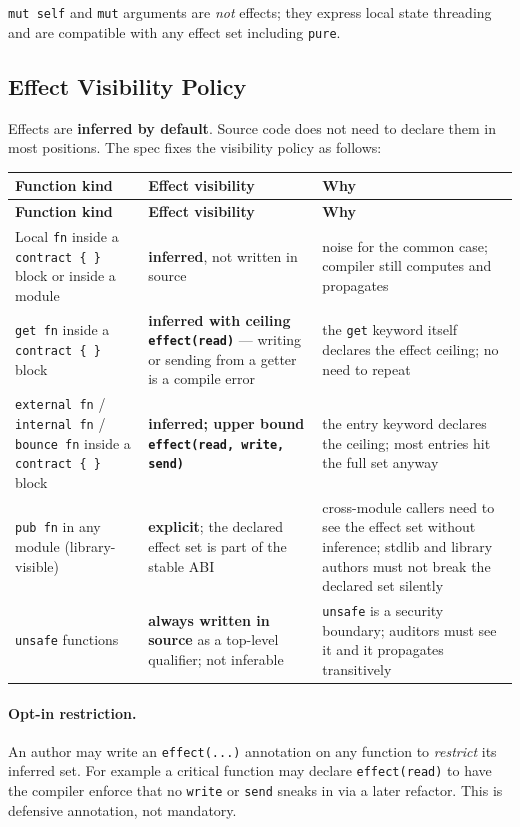 \documentclass[12pt,oneside]{article}
\begin{document}
\verb|mut self| and \verb|mut| arguments are \emph{not} effects; they
express local state threading and are compatible with any effect set
including \verb|pure|.

\subsection{Effect Visibility Policy}
\label{sec:effect-visibility}
Effects are \textbf{inferred by default}. Source code does not need to
declare them in most positions. The spec fixes the visibility policy
as follows:

\begin{longtable}{|p{}|p{}|p{}|}
\hline
\textbf{Function kind} & \textbf{Effect visibility} & \textbf{Why} \\ \hline
\endfirsthead
\hline
\textbf{Function kind} & \textbf{Effect visibility} & \textbf{Why} \\ \hline
\endhead
Local \verb|fn| inside a \verb|contract { }| block or inside a module &
\textbf{inferred}, not written in source &
noise for the common case; compiler still computes and propagates \\ \hline
\verb|get fn| inside a \verb|contract { }| block &
\textbf{inferred with ceiling \texttt{effect(read)}} --- writing or
sending from a getter is a compile error &
the \verb|get| keyword itself declares the effect ceiling; no need to
repeat \\ \hline
\verb|external fn| / \verb|internal fn| / \verb|bounce fn| inside a
\verb|contract { }| block &
\textbf{inferred; upper bound \texttt{effect(read, write, send)}} &
the entry keyword declares the ceiling; most entries hit the full set
anyway \\ \hline
\verb|pub fn| in any module (library-visible) &
\textbf{explicit}; the declared effect set is part of the stable ABI &
cross-module callers need to see the effect set without inference;
stdlib and library authors must not break the declared set
silently \\ \hline
\verb|unsafe| functions &
\textbf{always written in source} as a top-level qualifier; not inferable &
\verb|unsafe| is a security boundary; auditors must see it and it
propagates transitively \\ \hline
\end{longtable}

\paragraph{Opt-in restriction.}
An author may write an \verb|effect(...)| annotation on any function
to \emph{restrict} its inferred set. For example a critical function
may declare \verb|effect(read)| to have the compiler enforce that no
\verb|write| or \verb|send| sneaks in via a later refactor. This is
defensive annotation, not mandatory.
\end{document}
